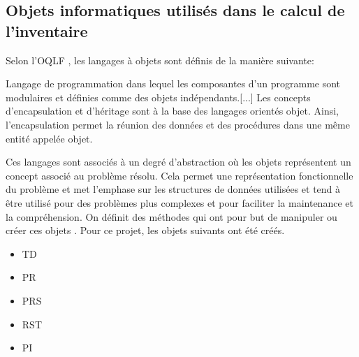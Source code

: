     \subsection{Objets informatiques utilisés dans le calcul de l'inventaire}
        Selon l'\ac{OQLF} \parencite{oqlf_langage_2006}, les langages à objets sont définis de la manière suivante: 
        \begin{definition}
            Langage de programmation dans lequel les composantes d'un programme sont modulaires et définies comme des objets indépendants.[...] Les concepts d'encapsulation et d'héritage sont à la base des langages orientés objet. Ainsi, l'encapsulation permet la réunion des données et des procédures dans une même entité appelée objet.
        \end{definition}
        Ces langages sont associés à un degré d'abstraction où les objets représentent un concept associé au problème résolu. Cela permet une représentation fonctionnelle du problème et met l'emphase sur les structures de données utilisées et tend à être utilisé pour des problèmes plus complexes et pour faciliter la maintenance et la compréhension. On définit des méthodes qui ont pour but de manipuler ou créer ces objets \parencite{lawhead_learning_2023}. Pour ce projet, les objets suivants ont été créés.
        \begin{itemize}
            \item \ac{TD}
            \item \ac{PR}
            \item \ac{PRS}
            \item \ac{RST}
            \item \ac{PI}
        \end{itemize}

